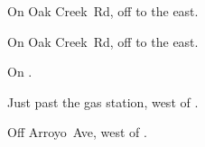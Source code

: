 
\begin{LocationList}

On Oak Creek~Rd, off  to the east.

On Oak Creek~Rd, off  to the east.

\Location{\GasStation \Gas}
On .

Just past the gas station, west of .

Off Arroyo~Ave, west of .

\end{LocationList}

